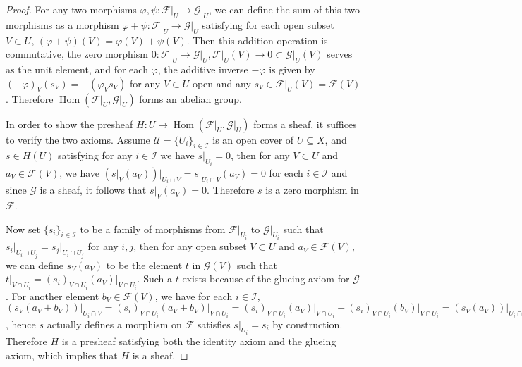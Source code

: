 \documentclass[12pt]{amsart}
\newcommand{\Hom}{\operatorname{Hom}}
\begin{document}
\begin{proof}
    For any two morphisms $\varphi ,\psi\colon\mathscr{F}\vert_U\to\mathscr{G}\vert_U $, we can define the sum of this two morphisms as a morphism $\varphi +\psi\colon\mathscr{F}\vert_U\to\mathscr{G}\vert_U $ satisfying for each open subset $V\subset U$, $(\varphi +\psi )(V) =\varphi (V)+\psi (V)$. Then this addition operation is commutative, the zero morphism $0\colon\mathscr{F}\vert_U\to\mathscr{G}\vert_U ,\mathscr{F}\vert_U (V)\to 0\subset\mathscr{G}\vert_U (V)$ serves as the unit element, and for each $\varphi $, the additive inverse $-\varphi $ is given by $(-\varphi )_V (s_V )=-(\varphi_V s_V )$ for any $V\subset U$ open and any $s_V\in\mathscr{F}\vert_U (V)=\mathscr{F} (V)$. Therefore $\Hom (\mathscr{F}\vert_U ,\mathscr{G}\vert_U )$ forms an abelian group.

    In order to show the presheaf $H\colon U\mapsto\Hom (\mathscr{F}\vert_U ,\mathscr{G}\vert_U )$ forms a sheaf, it suffices to verify the two axioms. Assume $\mathcal{U} =\{U_i\}_{i\in\mathcal{I} } $ is an open cover of $U\subseteq X$, and $s\in H(U)$ satisfying for any $i\in\mathcal{I} $ we have $s\vert_{U_i } =0$, then for any $V\subset U$ and $a_V\in\mathscr{F} (V)$, we have $(s\vert_V (a_V ))\vert_{U_i\cap V} =s\vert_{U_i\cap V} (a_V )=0$ for each $i\in\mathcal{I} $ and since $\mathscr{G} $ is a sheaf, it follows that $s\vert_V (a_V )=0$. Therefore $s$ is a zero morphism in $\mathscr{F} $.

		Now set $\{s_i\}_{i\in\mathcal{I}} $ to be a family of morphisms from $\mathscr{F}\vert_{U_i } $ to $\mathscr{G}\vert_{U_i } $ such that $s_i\vert_{U_i\cap U_j } =s_j\vert_{U_i\cap U_j } $ for any $i,j$, then for any open subset $V\subset U$ and $a_V\in\mathscr{F} (V) $, we can define $s_V (a_V )$ to be the element $t$ in $\mathscr{G} (V)$ such that $t\vert_{V\cap U_i } =(s_i )_{V\cap U_i } (a_V )\vert_{V\cap U_i } $. Such a $t$ exists because of the glueing axiom for $\mathscr{G} $. For another element $b_V\in\mathscr{F} (V)$, we have for each $i\in\mathcal{I} $, $(s_V (a_V +b_V ))\vert_{U_i\cap V} =(s_i )_{V\cap U_i } (a_V +b_V )\vert_{V\cap U_i } =(s_i )_{V\cap U_i } (a_V )\vert_{V\cap U_i } +(s_i )_{V\cap U_i } (b_V )\vert_{V\cap U_i } = (s_V (a_V ))\vert_{U_i\cap V} +(s_V (b_V ))\vert_{U_i\cap V } $, hence $s$ actually defines a morphism on $\mathscr{F} $ satisfies $s\vert_{U_i } =s_i $ by construction. Therefore $H$ is a presheaf satisfying both the identity axiom and the glueing axiom, which implies that $H$ is a sheaf.
\end{proof}
\end{document}
